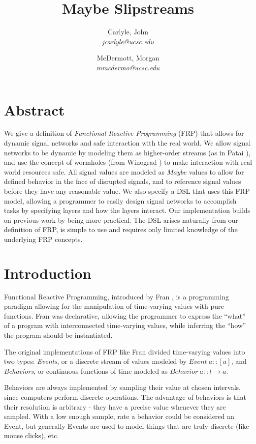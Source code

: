 \documentclass[twocolumn,11pt,english]{article}
\title{Maybe Slipstreams}
\date{}
\author{
  Carlyle, John\\
  \textit{jcarlyle@ucsc.edu}
  \and
  McDermott, Morgan\\
  \textit{mmcdermo@ucsc.edu}
}
\begin{document}
\maketitle

\section*{Abstract}
We give a definition of \textit{Functional Reactive Programming} (FRP) that allows for dynamic signal networks and safe interaction with the real world. We allow signal networks to be dynamic by modeling them as higher-order streams (as in Patai \cite{HighOrderStreams}), and use the concept of wormholes (from Winograd \cite{WinogradCort2012HS}) to make interaction with real world resources safe. All signal values are modeled as $Maybe$ values to allow for defined behavior in the face of disrupted signals, and to reference signal values before they have any reasonable value. We also specify a DSL that uses this FRP model, allowing a programmer to easily design signal networks to accomplish tasks by specifying layers and how the layers interact. Our implementation builds on previous work by being more practical. The DSL arises naturally from our definition of FRP, is simple to use and requires only limited knowledge of the underlying FRP concepts.

\section{Introduction}
  
Functional Reactive Programming, introduced by Fran \cite{ElliottHudak97:Fran}, is a programming paradigm allowing for the manipulation of time-varying values with pure functions. Fran was declarative, allowing the programmer to express the ``what'' of a program with interconnected time-varying values, while inferring the ``how'' the program should be instantiated. 

The original implementations of FRP like Fran divided time-varying values into two types: \textit{Events}, or a discrete stream of values modeled by $Event~a:: [a]$, and \textit{Behaviors}, or continuous functions of time modeled as $Behavior~a :: t \rightarrow a$. 

Behaviors are always implemented by sampling their value at chosen intervals, since computers perform discrete operations. The advantage of behaviors is that their resolution is arbitrary - they have a precise value whenever they are sampled. With a low enough sample, rate a behavior could be considered an Event, but generally Events are used to model things that are truly discrete (like mouse clicks), etc. 
\end{document}

